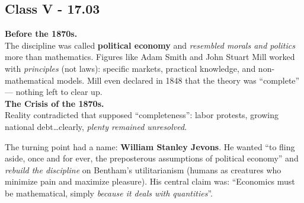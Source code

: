 \documentclass[a4paper,12pt]{article}
\begin{document}
\subsection*{Class V - 17.03}
\noindent \textbf{Before the 1870s.} \\
\noindent The discipline was called \textbf{political economy} and \emph{resembled morals and politics} more than mathematics. Figures like Adam Smith and John Stuart Mill worked with \emph{principles} (not laws): specific markets, practical knowledge, and non-mathematical models. Mill even declared in 1848 that the theory was ``complete'' --- nothing left to clear up. \\

\noindent \textbf{The Crisis of the 1870s.} \\
\noindent Reality contradicted that supposed ``completeness'': labor protests, growing national debt\dots clearly, \emph{plenty remained unresolved}.

\noindent The turning point had a name: \textbf{William Stanley Jevons}. He wanted ``to fling aside, once and for ever, the preposterous assumptions of political economy'' and \emph{rebuild the discipline} on Bentham's utilitarianism (humans as creatures who minimize pain and maximize pleasure). His central claim was: ``Economics must be mathematical, simply \emph{because it deals with quantities}''.
\end{document}
